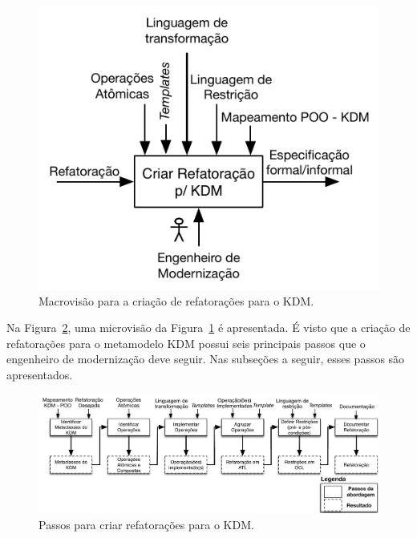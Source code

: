 \begin{figure}[h]
	\centering
	\caption{Macrovisão para a criação de refatorações para o KDM.}
	\label{fig:diretrizes_kdm_refatoracao_capitulo}
	\includegraphics[scale=0.9]{images/novoMacroAbordagemKDMRefactoring2}
	\fautor
\end{figure}


Na Figura~\ref{fig:todos_os_passos_diretrizes}, uma microvisão da Figura~\ref{fig:diretrizes_kdm_refatoracao_capitulo} é apresentada. É visto que a criação de refatorações para o metamodelo KDM possui seis principais passos que o engenheiro de modernização deve seguir. Nas subseções a seguir, esses passos são apresentados. %


\begin{figure}[h]
	\centering
	\caption{Passos para criar refatorações para o KDM.}
	\label{fig:todos_os_passos_diretrizes}
	\includegraphics[scale=0.6]{images/Abordagem_Criar_RefatoracaoFinal2}
	\fautor
\end{figure}

